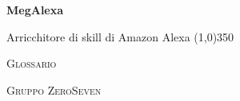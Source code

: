 \documentclass[a4paper,12pt]{book}
\author{Mirko Franco}
\date{14-12-2018}
\begin{document}
\begin{titlepage}
	\centering
	{\huge\bfseries MegAlexa\par}
	Arricchitore di skill di Amazon Alexa
	\line(1,0){350} \\
	{\scshape\LARGE Glossario \par}
	\vspace{1cm}
	{\scshape Gruppo ZeroSeven \par}
	\logo
\end{titlepage}


	

	
	\label{LastFrontPage}
	\newpage	
			
	\label{LastPage}
\end{document}
